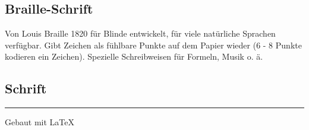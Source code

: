 \documentclass[12pt,landscape]{article}
\begin{document}
\begin{multicols}{3}
\subsection{Braille-Schrift}
Von Louis Braille 1820 für Blinde entwickelt, für viele natürliche Sprachen verfügbar. Gibt Zeichen als fühlbare Punkte auf dem Papier wieder (6 - 8 Punkte kodieren ein Zeichen). Spezielle Schreibweisen für Formeln, Musik o. ä.

\subsection{Schrift}


\rule{0.3\linewidth}{0.25pt}
\scriptsize

Gebaut mit \LaTeX

\end{multicols}
\end{document}
